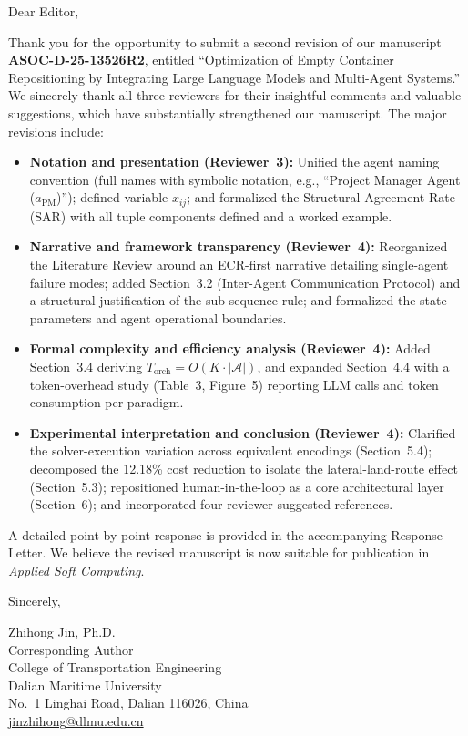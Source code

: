 \documentclass[12pt,a4paper]{article}
\begin{document}
\noindent Dear Editor,

\vspace{0.8em}

Thank you for the opportunity to submit a second revision of our manuscript \textbf{ASOC-D-25-13526R2}, entitled ``Optimization of Empty Container Repositioning by Integrating Large Language Models and Multi-Agent Systems.'' We sincerely thank all three reviewers for their insightful comments and valuable suggestions, which have substantially strengthened our manuscript. The major revisions include:

\begin{itemize}\itemsep2pt
  \item \textbf{Notation and presentation (Reviewer~3):} Unified the agent naming convention (full names with symbolic notation, e.g., ``Project Manager Agent ($a_{\text{PM}}$)''); defined variable $x_{ij}$; and formalized the Structural-Agreement Rate (SAR) with all tuple components defined and a worked example.

  \item \textbf{Narrative and framework transparency (Reviewer~4):} Reorganized the Literature Review around an ECR-first narrative detailing single-agent failure modes; added Section~3.2 (Inter-Agent Communication Protocol) and a structural justification of the sub-sequence rule; and formalized the state parameters and agent operational boundaries.

  \item \textbf{Formal complexity and efficiency analysis (Reviewer~4):} Added Section~3.4 deriving $T_{\text{orch}}=O(K\cdot|\mathcal{A}|)$, and expanded Section~4.4 with a token-overhead study (Table~3, Figure~5) reporting LLM calls and token consumption per paradigm.

  \item \textbf{Experimental interpretation and conclusion (Reviewer~4):} Clarified the solver-execution variation across equivalent encodings (Section~5.4); decomposed the 12.18\% cost reduction to isolate the lateral-land-route effect (Section~5.3); repositioned human-in-the-loop as a core architectural layer (Section~6); and incorporated four reviewer-suggested references.
\end{itemize}

A detailed point-by-point response is provided in the accompanying Response Letter. We believe the revised manuscript is now suitable for publication in \textit{Applied Soft Computing}.

\vspace{1.2em}

\noindent Sincerely,

\vspace{1em}

\noindent Zhihong Jin, Ph.D.\\
Corresponding Author\\
College of Transportation Engineering\\
Dalian Maritime University\\
No.~1 Linghai Road, Dalian 116026, China\\
\href{mailto:jinzhihong@dlmu.edu.cn}{jinzhihong@dlmu.edu.cn}
\end{document}
